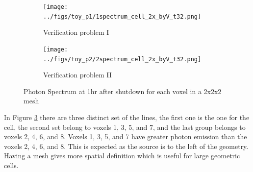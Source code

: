 \begin{figure}[h]
 \begin{centering}
 \centering
 \begin{subfigure}[b]{.45\textwidth}
 \texttt{[image: ../figs/toy\_p1/1spectrum\_cell\_2x\_byV\_t32.png]}
 \caption{Verification problem I }
 \label{1spect_cell_2x_byV}
 \end{subfigure}
 \hspace{0.05cm}
 \begin{subfigure}[b]{.45\textwidth}
 \centering
 \texttt{[image: ../figs/toy\_p2/2spectrum\_cell\_2x\_byV\_t32.png]}
 \caption{Verification problem II}
 \label{2spect_cell_2x_byV}
 \end{subfigure}
 \caption{Photon Spectrum at 1hr after shutdown for each voxel in a 2x2x2 mesh}
 \label{spect_cell_2x_byV}
 \end{centering}
\end{figure}
In Figure \ref{spect_cell_2x_byV} there are three distinct set of the lines, the 
first one is the one for the cell, the second set belong to voxels 1, 3, 5, and 7, and the 
last group belongs to voxels 2, 4, 6, and 8. Voxels 1, 3, 5, and 7 have greater photon emission 
than the voxels 2, 4, 6, and 8. This is expected as the source is to the left of the geometry. 
Having a mesh gives more spatial definition which is useful for large geometric cells. 
\newpage
